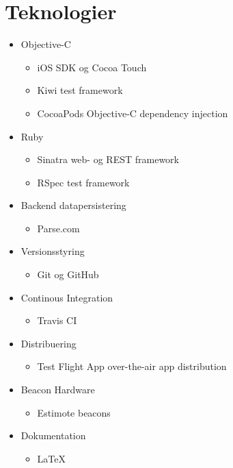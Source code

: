 \chapter{Teknologier}
\label{ch:teknologier}

\begin{itemize}
	\item Objective-C
		\begin{itemize}
			\item iOS SDK og Cocoa Touch
			\item Kiwi test framework
			\item CocoaPods Objective-C dependency injection
		\end{itemize}
	
	\item Ruby
		\begin{itemize}
			\item Sinatra web- og REST framework
			\item RSpec test framework
		\end{itemize}
	
	\item Backend datapersistering
		\begin{itemize}
			\item Parse.com
		\end{itemize}
	
	\item Versionsstyring
		\begin{itemize}
			\item Git og GitHub
		\end{itemize}
	
	\item Continous Integration
		\begin{itemize}
			\item Travis CI
		\end{itemize}
	
	\item Distribuering
		\begin{itemize}
			\item Test Flight App over-the-air app distribution
		\end{itemize}
	
	\item Beacon Hardware
		\begin{itemize}
			\item Estimote beacons
		\end{itemize}
	
	\item Dokumentation
		\begin{itemize}
			\item{LaTeX}
		\end{itemize}
\end{itemize}